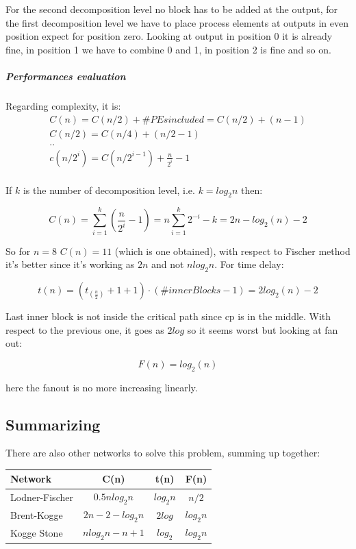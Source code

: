 For the second decomposition level no block has to be added at the output, for the first decomposition level we have to place process elements at outputs in even position expect for position zero. Looking at output in position 0 it is already fine, in position 1 we have to combine 0 and 1, in position 2 is fine and so on.

\subparagraph{Performances evaluation}
Regarding complexity, it is:
\begin{eqnarray}
C(n)=C(n/2)+ \#PEs included= C(n/2)+ (n-1)\\
C(n/2)=C(n/4)+(n/2 - 1)\\
..\\
c(n/2^i)=C(n/2^{i-1})+ \frac{n}{2^i}-1\\
\end{eqnarray}

If $k$ is the number of decomposition level, i.e. $k=log_2 n$ then:

$$C(n)=\sum_{i=1}^{k}(\frac{n}{2^i}-1)= n \sum_{i=1}^{k} 2^{-i}-k= 2n-log_2( n) - 2$$

So for $n=8$ $C(n)=11$ (which is one obtained), with respect to Fischer method it's better since it's working as $2n$ and not $nlog_2 n$. For time delay:

$$t(n)=(t_(\frac{n}{2}) + 1 + 1) \cdot (\#innerBlocks -1) = 2log_2 (n) -2$$

Last inner block is not inside the critical path since cp is in the middle. With respect to the previous one, it goes as $2 log$ so it seems worst but looking at fan out:

$$F(n)=log_2 (n)$$

here the fanout is no more increasing linearly.

\subsection{Summarizing}
There are also other networks to solve this problem, summing up together:

\begin{center}
  \begin{tabular}{|l|c|c|c|}
    \hline
    Network&      C(n)&     t(n)&     F(n)\\
    \hline
    Lodner-Fischer&   $0.5nlog_2n$&   $log_2n$&   $n/2$\\
    Brent-Kogge &   $2n-2-log_2n$&    $2log$&     $log_2 n$\\
    Kogge Stone &   $nlog_2n - n+1$&   $log_2$&     $log_2 n$\\
    \hline
  \end{tabular}
\end{center}



